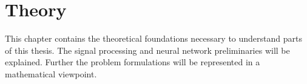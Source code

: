 \chapter{Theory}
This chapter contains the theoretical foundations necessary to understand parts of this thesis. 
The signal processing and neural network preliminaries will be explained.
Further the problem formulations will be represented in a mathematical viewpoint.










